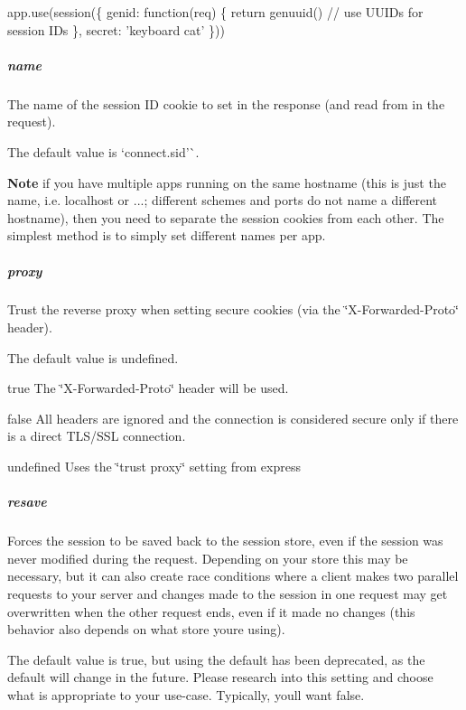 \begin{DoxyCode}
app.use(session(\{
  genid: function(req) \{
    return genuuid() // use UUIDs for session IDs
  \},
  secret: 'keyboard cat'
\}))
\end{DoxyCode}


\subparagraph*{name}

The name of the session ID cookie to set in the response (and read from in the request).

The default value is `\textquotesingle{}connect.\+sid'\`{}.

{\bfseries Note} if you have multiple apps running on the same hostname (this is just the name, i.\+e. {\ttfamily localhost} or {...}; different schemes and ports do not name a different hostname), then you need to separate the session cookies from each other. The simplest method is to simply set different {\ttfamily name}s per app.

\subparagraph*{proxy}

Trust the reverse proxy when setting secure cookies (via the \char`\"{}\+X-\/\+Forwarded-\/\+Proto\char`\"{} header).

The default value is {\ttfamily undefined}.


\begin{DoxyItemize}
\item {\ttfamily true} The \char`\"{}\+X-\/\+Forwarded-\/\+Proto\char`\"{} header will be used.
\item {\ttfamily false} All headers are ignored and the connection is considered secure only if there is a direct T\+L\+S/\+S\+SL connection.
\item {\ttfamily undefined} Uses the \char`\"{}trust proxy\char`\"{} setting from express
\end{DoxyItemize}

\subparagraph*{resave}

Forces the session to be saved back to the session store, even if the session was never modified during the request. Depending on your store this may be necessary, but it can also create race conditions where a client makes two parallel requests to your server and changes made to the session in one request may get overwritten when the other request ends, even if it made no changes (this behavior also depends on what store you\textquotesingle{}re using).

The default value is {\ttfamily true}, but using the default has been deprecated, as the default will change in the future. Please research into this setting and choose what is appropriate to your use-\/case. Typically, you\textquotesingle{}ll want {\ttfamily false}.

